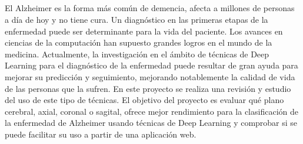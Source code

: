 \thispagestyle{empty}

\begin{center}
{\large\bfseries \myTitle}\\
\end{center}
\begin{center}
       \myName\\
\end{center}

\vspace{0.7cm}
\\

\vspace{0.7cm}
\\
El Alzheimer es la forma más común de demencia, afecta a millones de personas a día de hoy y no tiene cura.
Un diagnóstico en las primeras etapas de la enfermedad puede ser determinante para la vida del paciente.
Los avances en ciencias de la computación han supuesto grandes logros en el mundo de la medicina.
Actualmente, la investigación en el ámbito de técnicas de Deep Learning para el diagnóstico de la enfermedad puede
resultar de gran ayuda para mejorar su predicción y seguimiento, mejorando notablemente la calidad de vida de las
personas que la sufren.
En este proyecto se realiza una revisión y estudio del uso de este tipo de técnicas.
El objetivo del proyecto es evaluar qué plano cerebral, axial, coronal o sagital, ofrece mejor rendimiento para la
clasificación de la enfermedad de Alzheimer usando técnicas de Deep Learning y comprobar si se puede facilitar su uso a
partir de una aplicación web.
\cleardoublepage
\thispagestyle{empty}


\begin{center}
{\large\bfseries \myTitleEn}\\
\end{center}
\begin{center}
       \myName\\
\end{center}

\vspace{0.7cm}
\\

\vspace{0.7cm}
\\

